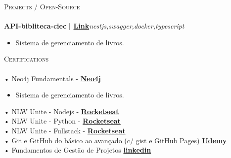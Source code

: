 \documentclass[a4paper]{article}
\newcommand{\lineunder} {
    \vspace*{-8pt} \\
    \hspace*{-18pt} \hrulefill \\
}
\newcommand{\header} [1] {
    {\hspace*{-18pt}\vspace*{6pt} \textsc{#1}}
    \vspace*{-6pt} \lineunder
}
\begin{document}
      \header{Projects / Open-Source}
      \vspace{2mm}
      {\textbf{API-bibliteca-ciec}}\textbf{ | \href{https://github.com/Alttabcorp/API-bibliteca_siec}{Link}}\hfill{\sl nestjs,swagger,docker,typescript}\\
          \vspace{-3mm}
\begin{itemize} \itemsep -3pt
\item[] Sistema de gerenciamento de livros.
\end{itemize}
          \vspace*{3mm}

      \header{Certifications}
      \vspace{2mm}
      • Neo4j Fundamentals - \textbf{\href{https://graphacademy.neo4j.com/c/9d25b359-5995-4053-8475-7b2bf61f163e/}{Neo4j}}\\
      \begin{itemize} \itemsep -3pt
        \item[] Sistema de gerenciamento de livros.
        \end{itemize} 
\vspace*{1mm}
      • NLW Unite - Nodejs - \textbf{\href{https://app.rocketseat.com.br/certificates/a53012ec-27a9-419e-9a8c-86f28508a406}{Rocketseat}}\\
\vspace*{1mm}
      • NLW Unite - Python - \textbf{\href{https://app.rocketseat.com.br/certificates/c5f21b9b-53c5-4ed7-bc45-430d87cccf77}{Rocketseat}}\\
\vspace*{1mm}
      • NLW Unite - Fullstack - \textbf{\href{https://app.rocketseat.com.br/certificates/d3577eb6-c50f-42f3-b595-b96297ef0e05}{Rocketseat}}\\
\vspace*{1mm}
     • Git e GitHub do básico ao avançado (c/ gist e GitHub Pages) \textbf{\href{https://www.udemy.com/certificate/UC-db57cce7-1471-47ff-9828-0e3a4d7da628/}{Udemy}}\\
\vspace*{1mm}
     • Fundamentos de Gestão de Projetos
     \textbf{\href{https://www.linkedin.com/learning/certificates/0fc1a744c87dc72f53e8c694fd58809808a183327167377cb224c1ac43e732b6}{linkedin}}\\

\vspace{2mm}

    \ 
    
\end{document}
